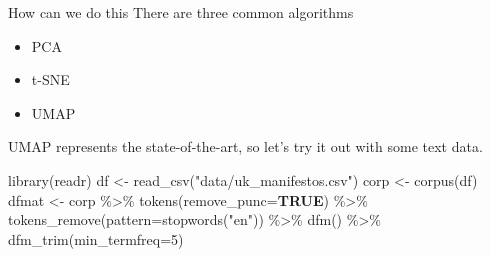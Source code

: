 \documentclass[
  10pt,
  ignorenonframetext,
  aspectratio=169]{beamer}
\newenvironment{Shaded}{\begin{snugshade}}{\end{snugshade}}
\newcommand{\AttributeTok}[1]{\textcolor[rgb]{0.80,0.80,0.80}{#1}}
\newcommand{\ConstantTok}[1]{\textcolor[rgb]{0.86,0.64,0.64}{\textbf{#1}}}
\newcommand{\DecValTok}[1]{\textcolor[rgb]{0.86,0.86,0.80}{#1}}
\newcommand{\FunctionTok}[1]{\textcolor[rgb]{0.94,0.94,0.56}{#1}}
\newcommand{\NormalTok}[1]{\textcolor[rgb]{0.80,0.80,0.80}{#1}}
\newcommand{\OtherTok}[1]{\textcolor[rgb]{0.94,0.94,0.56}{#1}}
\newcommand{\SpecialCharTok}[1]{\textcolor[rgb]{0.86,0.64,0.64}{#1}}
\newcommand{\StringTok}[1]{\textcolor[rgb]{0.80,0.58,0.58}{#1}}
\providecommand{\tightlist}{%
  \setlength{\itemsep}{0pt}\setlength{\parskip}{0pt}}
\begin{document}
\begin{frame}[fragile]{How can we do this}
\protect\hypertarget{how-can-we-do-this}{}
There are three common algorithms

\begin{itemize}
\tightlist
\item
  PCA
\item
  t-SNE
\item
  UMAP
\end{itemize}

UMAP represents the state-of-the-art, so let's try it out with some text
data.

\scriptsize

\begin{Shaded}
\begin{Highlighting}[]
\FunctionTok{library}\NormalTok{(readr)}
\NormalTok{df }\OtherTok{\textless{}{-}} \FunctionTok{read\_csv}\NormalTok{(}\StringTok{"data/uk\_manifestos.csv"}\NormalTok{)}
\NormalTok{corp }\OtherTok{\textless{}{-}} \FunctionTok{corpus}\NormalTok{(df)}
\NormalTok{dfmat }\OtherTok{\textless{}{-}}\NormalTok{ corp }\SpecialCharTok{\%\textgreater{}\%} \FunctionTok{tokens}\NormalTok{(}\AttributeTok{remove\_punc=}\ConstantTok{TRUE}\NormalTok{) }\SpecialCharTok{\%\textgreater{}\%}
  \FunctionTok{tokens\_remove}\NormalTok{(}\AttributeTok{pattern=}\FunctionTok{stopwords}\NormalTok{(}\StringTok{"en"}\NormalTok{)) }\SpecialCharTok{\%\textgreater{}\%}
  \FunctionTok{dfm}\NormalTok{() }\SpecialCharTok{\%\textgreater{}\%}
  \FunctionTok{dfm\_trim}\NormalTok{(}\AttributeTok{min\_termfreq=}\DecValTok{5}\NormalTok{)}
\end{Highlighting}
\end{Shaded}
\end{frame}
\end{document}
